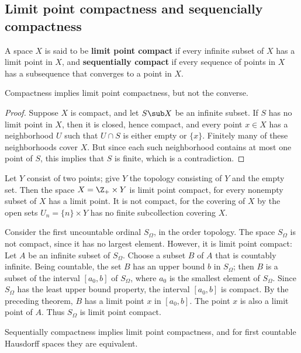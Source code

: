 \subsection{Limit point compactness and sequencially compactness}
A space $X$ is said to be \textbf{limit point compact} if every infinite subset of $X$ has a limit point in $X$, and \textbf{sequentially compact} if every sequence of points in $X$ has a subsequence that converges to a point in $X$.
\begin{proposition}\label{compact to limit point}
Compactness implies limit point compactness, but not the converse.
\end{proposition}
\begin{proof}
Suppose $X$ is compact, and let $S\sub X$ be an infinite subset. If $S$ has no limit point in $X$, then it is closed, hence compact, and every point $x\in X$ has a neighborhood $U$ such that $U\cap S$ is either empty or $\{x\}$. Finitely many of these neighborhoods cover $X$. But since each such neighborhood contains at most one point of $S$, this implies that $S$ is finite, which is a contradiction.
\end{proof}
\begin{example}
Let $Y$ consist of two points; give $Y$ the topology consisting of $Y$ and the empty set. Then the space $X=\Z_+\times Y$ is limit point compact, for every nonempty subset of $X$ has a limit point. It is not compact, for the covering of $X$ by the open sets $U_n=\{n\}\times Y$ has no finite subcollection covering $X$.
\end{example}
\begin{example}
Consider the first uncountable ordinal $S_\Omega$, in the order topology. The space $S_\Omega$ is not compact, since it has no largest element. However, it is limit point compact: Let $A$ be an infinite subset of $S_\Omega$. Choose a subset $B$ of $A$ that is countably infinite. Being countable, the set $B$ has an upper bound $b$ in $S_\Omega$; then $B$ is a subset of the interval $[a_0,b]$ of $S_\Omega$, where $a_0$ is the smallest element of $S_\Omega$. Since $S_\Omega$ has the least upper bound property, the interval $[a_0,b]$ is compact. By the preceding theorem, $B$ has a limit point $x$ in $[a_0,b]$. The point $x$ is also a limit point of $A$. Thus $S_\Omega$ is limit point compact.
\end{example}
\begin{proposition}\label{limit point compact to seq}
Sequentially compactness implies limit point compactness, and for first countable Hausdorff spaces they are equivalent.
\end{proposition}

